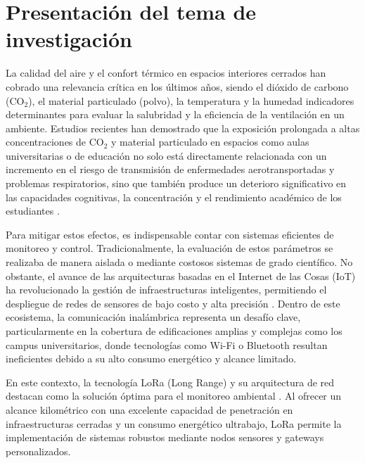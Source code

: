 
\section{Presentación del tema de investigación}

La calidad del aire y el confort térmico en espacios interiores cerrados han cobrado una relevancia crítica en los últimos años, siendo el dióxido de carbono (CO\(_2\)), el material particulado (polvo), la temperatura y la humedad indicadores determinantes para evaluar la salubridad y la eficiencia de la ventilación en un ambiente. Estudios recientes han demostrado que la exposición prolongada a altas concentraciones de CO\(_2\) y material particulado en espacios como aulas universitarias o de educación no solo está directamente relacionada con un incremento en el riesgo de transmisión de enfermedades aerotransportadas y problemas respiratorios, sino que también produce un deterioro significativo en las capacidades cognitivas, la concentración y el rendimiento académico de los estudiantes \cite{effects_of_low_level_inhalation_exposure_to_carbon_dioxide_in_indoor_environments_a_short_review_on_human_health_and_psychomotor_performance, lopez_carreno_2025}.

Para mitigar estos efectos, es indispensable contar con sistemas eficientes de monitoreo y control. Tradicionalmente, la evaluación de estos parámetros se realizaba de manera aislada o mediante costosos sistemas de grado científico. No obstante, el avance de las arquitecturas basadas en el Internet de las Cosas (IoT) ha revolucionado la gestión de infraestructuras inteligentes, permitiendo el despliegue de redes de sensores de bajo costo y alta precisión \cite{Achieving_better_indoor_air_quality_with_IoT_systems_for_future_buildings_Opportunities_and_challenges}. Dentro de este ecosistema, la comunicación inalámbrica representa un desafío clave, particularmente en la cobertura de edificaciones amplias y complejas como los campus universitarios, donde tecnologías como Wi-Fi o Bluetooth resultan ineficientes debido a su alto consumo energético y alcance limitado.

En este contexto, la tecnología LoRa (Long Range) y su arquitectura de red destacan como la solución óptima para el monitoreo ambiental \cite{A_Survey_of_LoRaWAN_for_IoT_From_Technology_to_Application}. Al ofrecer un alcance kilométrico con una excelente capacidad de penetración en infraestructuras cerradas y un consumo energético ultrabajo, LoRa permite la implementación de sistemas robustos mediante nodos sensores y gateways personalizados.

